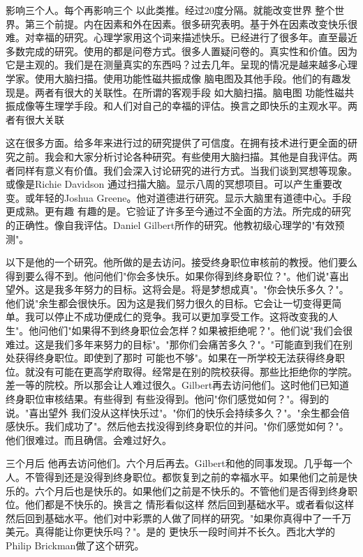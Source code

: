 影响三个人。每个再影响三个 以此类推。经过20度分隔。就能改变世界 整个世界。第三个前提。内在因素和外在因素。很多研究表明。基于外在因素改变快乐很难。对幸福的研究。心理学家用这个词来描述快乐。已经进行了很多年。直至最近 多数完成的研究。使用的都是问卷方式。很多人置疑问卷的。真实性和价值。因为它是主观的。我们是在测量真实的东西吗？过去几年。呈现的情况是越来越多心理学家。使用大脑扫描。使用功能性磁共振成像 脑电图及其他手段。他们的有趣发现是。两者有很大的关联性。在所谓的客观手段 如大脑扫描。脑电图 功能性磁共振成像等生理学手段。和人们对自己的幸福的评估。换言之即快乐的主观水平。两者有很大关联 

这在很多方面。给多年来进行过的研究提供了可信度。在拥有技术进行更全面的研究之前。我会和大家分析讨论各种研究。有些使用大脑扫描。其他是自我评估。两者同样有意义有价值。我们会深入讨论研究的进行方式。当我们谈到冥想等现象。或像是Richie Davidson 通过扫描大脑。显示八周的冥想项目。可以产生重要改变。或年轻的Joshua Greene。他对道德进行研究。显示大脑里有道德中心。手段更成熟。更有趣 有趣的是。它验证了许多至今通过不全面的方法。所完成的研究的正确性。像自我评估。Daniel Gilbert所作的研究。他教初级心理学的"有效预测"。 

以下是他的一个研究。他所做的是去访问。接受终身职位审核前的教授。他们要么得到要么得不到。他问他们"你会多快乐。如果你得到终身职位？"。他们说"喜出望外。这是我多年努力的目标。这将会是。将是梦想成真"。"你会快乐多久？"。他们说"余生都会很快乐。因为这是我们努力很久的目标。它会让一切变得更简单。我可以停止不成功便成仁的竞争。我可以更加享受工作。这将改变我的人生"。他问他们"如果得不到终身职位会怎样？如果被拒绝呢？"。他们说"我们会很难过。这是我们多年来努力的目标"。"那你们会痛苦多久？"。"可能直到我们在别处获得终身职位。即使到了那时 可能也不够"。如果在一所学校无法获得终身职位。就没有可能在更高学府取得。经常是在别的院校获得。那些比拒绝你的学院。差一等的院校。所以那会让人难过很久。Gilbert再去访问他们。这时他们已知道终身职位审核结果。有些得到 有些没得到。他问"你们感觉如何？"。得到的说。"喜出望外 我们没从这样快乐过"。"你们的快乐会持续多久？"。"余生都会倍感快乐。我们成功了"。然后他去找没得到终身职位的并问。"你们感觉如何？"。他们很难过。而且确信。会难过好久。 

三个月后 他再去访问他们。六个月后再去。Gilbert和他的同事发现。几乎每一个人。不管得到还是没得到终身职位。都恢复到之前的幸福水平。如果他们之前是快乐的。六个月后也是快乐的。如果他们之前是不快乐的。不管他们是否得到终身职位。他们都是不快乐的。换言之 情形看似这样 然后回到基础水平。或者看似这样 然后回到基础水平。他们对中彩票的人做了同样的研究。"如果你真得中了一千万美元。真得能让你更快乐吗？"。是的 更快乐一段时间并不长久。西北大学的Philip Brickman做了这个研究。 

